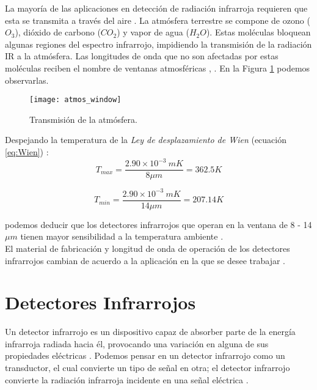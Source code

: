 La mayoría de las aplicaciones en detección de radiación infrarroja requieren que esta se transmita a través del aire \cite{Jimenez}. La atmósfera terrestre se compone de ozono ($O_{3}$), dióxido de carbono ($CO_{2}$) y vapor de agua ($H_{2}O$). Estas moléculas bloquean algunas regiones del espectro infrarrojo, impidiendo la transmisión de la radiación IR a la atmósfera. Las longitudes de onda que no son afectadas por estas moléculas reciben el nombre de ventanas atmosféricas \cite{Rogalski}, \cite{Motilal}. En la Figura \ref{fig:atmos_window} podemos observarlas.\\

            \begin{figure}[hbtp]
                \centering
                \texttt{[image: atmos\_window]}
                \caption{Transmisión de la atmósfera.}
                \label{fig:atmos_window}
            \end{figure}



Despejando la temperatura de la \textit{Ley de desplazamiento de Wien} (ecuación \ref{eq:Wien}) \cite{BlancoMDA}:
    \begin{equation}
        T_{max} = \frac{2.90\times10^{-3}\ mK}{8\mu m} = 362.5K
        \label{eq:tempmax}
    \end{equation}

    \begin{equation}
        T_{min} = \frac{2.90\times10^{-3}\ mK}{14\mu m} = 207.14K
        \label{eq:tempmin}
    \end{equation}

podemos deducir que los detectores infrarrojos que operan en la ventana de 8 - 14 $\mu m$ tienen mayor sensibilidad a la temperatura ambiente \cite{Rogalski}.\\

El material de fabricación y longitud de onda de operación de los detectores infrarrojos cambian de acuerdo a la aplicación en la que se desee trabajar \cite{Rogalski}.					           
     
    
    \section{Detectores Infrarrojos}
    
    Un detector infrarrojo es un dispositivo capaz de absorber parte de la energía infrarroja radiada hacia él, provocando una variación en alguna de sus propiedades eléctricas \cite{BlancoMDA}. Podemos pensar en un detector infrarrojo como un transductor, el cual convierte un tipo de señal en otra; el detector infrarrojo convierte la radiación infrarroja incidente en una señal eléctrica \cite{Vincent}.
    
